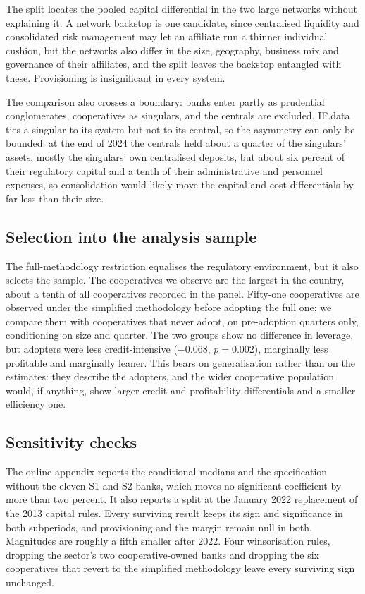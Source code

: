 \documentclass[11pt,a4paper]{article}
\begin{document}
The split locates the pooled capital differential in the two large networks without
explaining it. A network backstop is one candidate, since centralised
liquidity and consolidated risk management may let an affiliate run a thinner individual
cushion, but the networks also differ in the size, geography, business mix and governance
of their affiliates, and the split leaves the backstop entangled with these. Provisioning is insignificant in every system.

The comparison also crosses a boundary: banks enter partly as prudential conglomerates,
cooperatives as singulars, and the centrals are excluded. IF.data ties a singular to its
system but not to its central, so the asymmetry can only be bounded: at the end of 2024
the centrals held about a quarter of the singulars' assets, mostly the singulars' own
centralised deposits, but about six percent of their regulatory capital and a tenth of
their administrative and personnel expenses, so consolidation would likely move the
capital and cost differentials by far less than their size.

\subsection{Selection into the analysis sample}
\label{sec:selection}

The full-methodology restriction equalises the regulatory environment, but it also
selects the sample. The cooperatives we observe are the largest in the country, about a
tenth of all cooperatives recorded in the panel. Fifty-one cooperatives are observed
under the simplified methodology before adopting the full one; we compare them with
cooperatives that never adopt, on pre-adoption quarters only, conditioning on size and
quarter. The two groups show no difference in
leverage, but adopters were less credit-intensive ($-0.068$, $p=0.002$), marginally less
profitable and marginally leaner. This bears on generalisation rather than on the
estimates: they describe the adopters, and the wider cooperative population would, if
anything, show larger credit and profitability differentials and a smaller efficiency
one.

\subsection{Sensitivity checks}
\label{sec:robustness}

The online appendix reports the conditional medians and the specification without the
eleven S1 and S2 banks, which moves no significant coefficient by more than two percent.
It also reports a split at the January 2022 replacement of the 2013 capital rules. Every surviving result keeps its sign and significance in both subperiods, and
provisioning and the margin remain null in both. Magnitudes are roughly a fifth smaller
after 2022. Four winsorisation rules, dropping the sector's two cooperative-owned banks
and dropping the six cooperatives that revert to the simplified methodology leave every
surviving sign unchanged.
\end{document}

